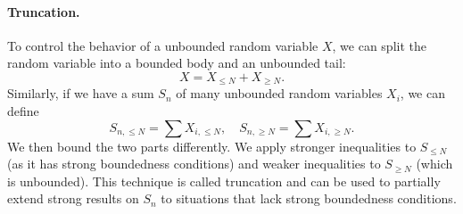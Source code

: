 \paragraph{Truncation.} To control the behavior of a unbounded random variable $X$, we can split the random variable into a bounded body and an unbounded tail:
\[
    X = X_{\leq N} + X_{\geq N}.
\]
Similarly, if we have a sum $S_n$ of many unbounded random variables $X_i$, we can define
\[
    S_{n, \leq N} = \sum X_{i, \leq N}, \quad S_{n, \geq N} = \sum X_{i, \geq N}.
\]
We then bound the two parts differently. We apply stronger inequalities to $S_{\leq N}$ (as it has strong boundedness conditions) and weaker inequalities to $S_{\geq N}$ (which is unbounded). This technique is called truncation and can be used to partially extend strong results on $S_n$ to situations that lack strong boundedness conditions.